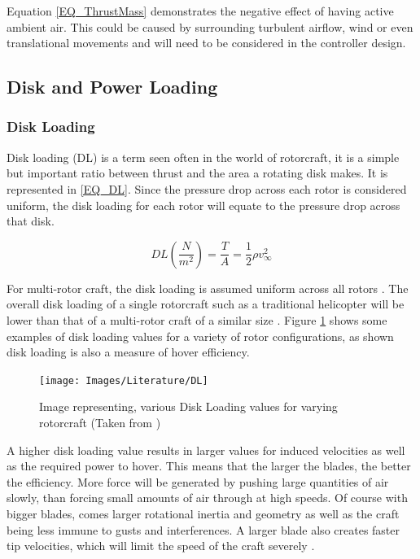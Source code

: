 	Equation \eqref{EQ_ThrustMass} demonstrates the negative effect of having active ambient air. This could be caused by surrounding turbulent airflow, wind or even translational movements and will need to be considered in the controller design.

	\subsection{Disk and Power Loading}
		\subsubsection{Disk Loading}
		Disk loading (DL) is a term seen often in the world of rotorcraft, it is a simple but important ratio between thrust and the area a rotating disk makes. It is represented in \eqref{EQ_DL}. Since the pressure drop across each rotor is considered uniform, the disk loading for each rotor will equate to the pressure drop across that disk.
		 
		\begin{equation}
		\label{EQ_DL}
		DL (\frac{N}{m^{2}})= \frac{T}{A} = \frac{1}{2} \rho v_\infty^2
		\end{equation}
		
		For multi-rotor craft, the disk loading is assumed uniform across all rotors \cite{Leishman}. The overall disk loading of a single rotorcraft such as a traditional helicopter will be lower than that of a multi-rotor craft of a similar size \cite{RotorCraftHand}.  Figure \ref{IM_DL} shows some examples of disk loading values for a variety of rotor configurations, as shown disk loading is also a measure of hover efficiency.
		\begin{figure}[H]
		\centering
		\texttt{[image: Images/Literature/DL]}     
		\caption{Image representing, various Disk Loading values for varying rotorcraft (Taken from \cite{Leishman})}
		\label{IM_DL}
		\end{figure}
		
		A higher disk loading value results in larger values for induced velocities as well as the required power to hover. This means that the larger the blades, the better the efficiency. More force will be generated by pushing large quantities of air slowly, than forcing small amounts of air through at high speeds. Of course with bigger blades, comes larger rotational inertia and geometry as well as the craft being less immune to gusts and interferences. A larger blade also creates faster tip velocities, which will limit the speed of the craft severely \cite{Leishman}.
		
